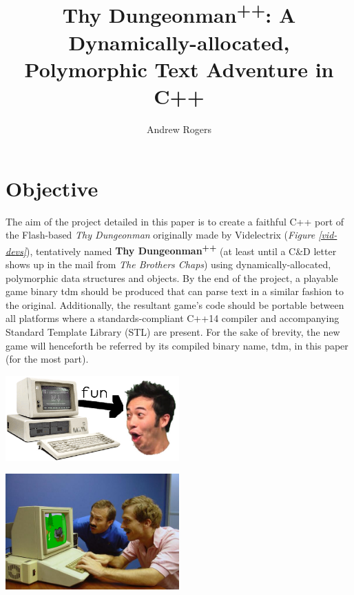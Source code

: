 \documentclass[man,12pt]{apa6}
\title{Thy Dungeonman\textsuperscript{++}: A Dynamically-allocated, Polymorphic
       Text Adventure in C++}
\author{Andrew Rogers}
\affiliation{Crazy Go Nuts University}
\begin{document}
 \maketitle


\section{Objective}
The aim of the project detailed in this paper is to create a faithful C++ port
of the Flash-based \emph{Thy Dungeonman} originally made by Videlectrix
(\emph{Figure \ref{vid-devs}}), tentatively named \textbf{Thy
Dungeonman\textsuperscript{++}} (at least until a C\&D letter shows up in the
mail from \emph{The Brothers Chaps}) using dynamically-allocated, polymorphic
data structures and objects.  By the end of the project, a playable game binary
\textsf{tdm} should be produced that can parse text in a similar fashion to the
original.  Additionally, the resultant game's code should be portable between
all platforms where a standards-compliant C++14 compiler and accompanying
Standard Template Library (STL) are present.
For the sake of brevity, the new game will henceforth be referred by its
compiled binary name, \textsf{tdm}, in this paper (for the most part).

\begin{center}
  \centering
    \includegraphics[width=0.5\textwidth]{use-case-dia}
  \captionsetup{justification=centering}
  \label{fun}
\end{center}

\begin{center}
  \centering
    \includegraphics[width=0.5\textwidth]{Videlectrix_developers}
  \captionsetup{justification=centering}
  \label{vid-devs}
\end{center}
\end{document}
